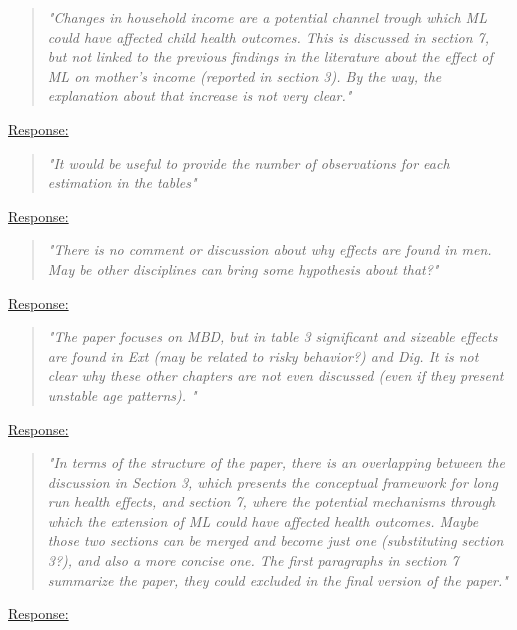  


% 
\begin{quote}
	\textit{"Changes in household income are a potential channel trough which ML could have affected child health outcomes. This is discussed in section 7, but not linked to the previous findings in the literature about the effect of ML on mother's income (reported in section 3). By the way, the explanation about that increase is not very clear."}
\end{quote}
\underline{Response:}

% 
\begin{quote}
	\textit{"It  would be useful to provide the number of observations for each estimation in the tables"}
\end{quote}
\underline{Response:}

% 
\begin{quote}
	\textit{"There is no comment or discussion about why effects are found in men. May be other disciplines can bring some hypothesis about that?"}
\end{quote}
\underline{Response:}

% 
\begin{quote}
	\textit{"The paper focuses on MBD, but in table 3 significant and sizeable effects are found in Ext (may be related to risky behavior?) and Dig. It is not clear why these other chapters are not even discussed (even if they present unstable age patterns). "}
\end{quote}
\underline{Response:}

\begin{quote}
	\textit{"In terms of the structure of the paper, there is an overlapping between the discussion in Section 3, which presents the conceptual framework for long run health effects, and section 7, where the potential mechanisms through which the extension of ML could have affected health outcomes. Maybe those two sections can be merged and become just one (substituting section 3?), and also a more concise one. The first paragraphs in section 7 summarize the paper, they could excluded in the final version of the paper."}
\end{quote}
\underline{Response:}

